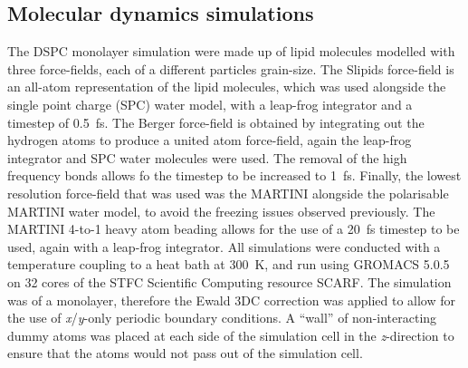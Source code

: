 \documentclass[twoside,twocolumn,9pt]{article}
\begin{document}
\subsection{Molecular dynamics simulations}
The DSPC monolayer simulation were made up of lipid molecules modelled with three force-fields, each of a different particles grain-size.
The Slipids force-field is an all-atom representation of the lipid molecules,\cite{Jambeck2012} which was used alongside the single point charge (SPC) water model,\cite{Berendsen1987} with a leap-frog integrator and a timestep of \SI{0.5}{\femto\second}.
The Berger force-field is obtained by integrating out the hydrogen atoms to produce a united atom force-field,\cite{Berger1997} again the leap-frog integrator and SPC water molecules were used.
The removal of the high frequency  bonds allows fo the timestep to be increased to \SI{1}{\femto\second}.
Finally, the lowest resolution force-field that was used was the MARTINI\cite{Marrink2007} alongside the polarisable MARTINI water model,\cite{Yesylevskyy2010} to avoid the freezing issues observed previously.\cite{Koutsioubas2016}
The MARTINI 4-to-1 heavy atom beading allows for the use of a \SI{20}{\femto\second} timestep to be used, again with a leap-frog integrator.
All simulations were conducted with a temperature coupling to a heat bath at \SI{300}{\kelvin}, and run using GROMACS 5.0.5 \cite{Berendsen1995,Lindahl2001,vanderSpoel2005,Hess2008} on 32 cores of the STFC Scientific Computing resource SCARF.
The simulation was of a monolayer, therefore the Ewald 3DC correction was applied to allow for the use of \emph{x}/\emph{y}-only periodic boundary conditions.\cite{InChul1999}
A ``wall'' of non-interacting dummy atoms was placed at each side of the simulation cell in the \emph{z}-direction to ensure that the atoms would not pass out of the simulation cell.
\end{document}
